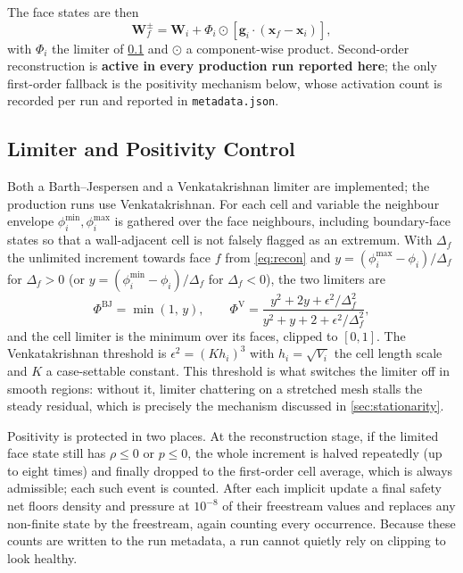 The face states are then
\begin{equation}
  \mathbf{W}^{\pm}_f=\mathbf{W}_{i}+\Phi_i\odot
  \left[\mathbf{g}_i\!\cdot\!(\mathbf{x}_f-\mathbf{x}_i)\right],
  \label{eq:recon}
\end{equation}
with $\Phi_i$ the limiter of \cref{sec:limiter} and $\odot$ a component-wise
product. Second-order reconstruction is \textbf{active in every production run
reported here}; the only first-order fallback is the positivity mechanism below,
whose activation count is recorded per run and reported in
\texttt{metadata.json}.

\subsection{Limiter and Positivity Control}
\label{sec:limiter}

Both a Barth--Jespersen and a Venkatakrishnan limiter are implemented; the
production runs use Venkatakrishnan. For each cell and variable the neighbour
envelope $\phi^{\min}_i,\phi^{\max}_i$ is gathered over the face neighbours,
including boundary-face states so that a wall-adjacent cell is not falsely
flagged as an extremum. With $\Delta_f$ the unlimited increment towards face $f$
from \cref{eq:recon} and
$y=(\phi^{\max}_i-\phi_i)/\Delta_f$ for $\Delta_f>0$ (or
$y=(\phi^{\min}_i-\phi_i)/\Delta_f$ for $\Delta_f<0$), the two limiters are
\begin{equation}
  \Phi^{\mathrm{BJ}}=\min\left(1,\,y\right),
  \qquad
  \Phi^{\mathrm{V}}=\frac{y^2+2y+\epsilon^2/\Delta_f^2}
                         {y^2+y+2+\epsilon^2/\Delta_f^2},
  \label{eq:limiter}
\end{equation}
and the cell limiter is the minimum over its faces, clipped to $[0,1]$. The
Venkatakrishnan threshold is $\epsilon^2=(K h_i)^3$ with
$h_i=\sqrt{V_i}$ the cell length scale and $K$ a case-settable constant. This
threshold is what switches the limiter off in smooth regions: without it,
limiter chattering on a stretched mesh stalls the steady residual, which is
precisely the mechanism discussed in \cref{sec:stationarity}.

Positivity is protected in two places. At the reconstruction stage, if the
limited face state still has $\rho\le0$ or $p\le0$, the whole increment is
halved repeatedly (up to eight times) and finally dropped to the first-order
cell average, which is always admissible; each such event is counted. After each
implicit update a final safety net floors density and pressure at
$10^{-8}$ of their freestream values and replaces any non-finite state by the
freestream, again counting every occurrence. Because these counts are written to
the run metadata, a run cannot quietly rely on clipping to look healthy.

